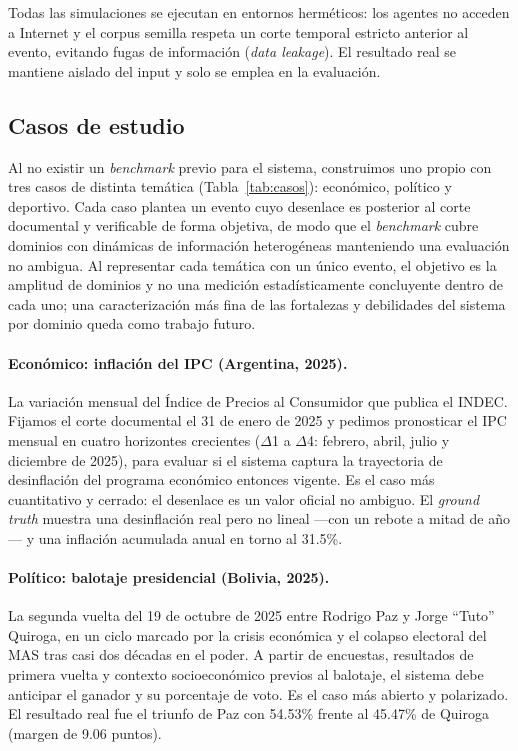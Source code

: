 \documentclass[11pt]{article}
\begin{document}
Todas las simulaciones se ejecutan en entornos herméticos: los agentes no acceden a Internet y el corpus semilla respeta un corte temporal estricto anterior al evento, evitando fugas de información (\textit{data leakage}). El resultado real se mantiene aislado del input y solo se emplea en la evaluación.

\subsection{Casos de estudio}
\label{subsec:casos}

Al no existir un \textit{benchmark} previo para el sistema, construimos uno propio con tres casos de distinta temática (Tabla~\ref{tab:casos}): económico, político y deportivo. Cada caso plantea un evento cuyo desenlace es posterior al corte documental y verificable de forma objetiva, de modo que el \textit{benchmark} cubre dominios con dinámicas de información heterogéneas manteniendo una evaluación no ambigua. Al representar cada temática con un único evento, el objetivo es la amplitud de dominios y no una medición estadísticamente concluyente dentro de cada uno; una caracterización más fina de las fortalezas y debilidades del sistema por dominio queda como trabajo futuro.

\paragraph{Económico: inflación del IPC (Argentina, 2025).} La variación mensual del Índice de Precios al Consumidor que publica el INDEC. Fijamos el corte documental el 31 de enero de 2025 y pedimos pronosticar el IPC mensual en cuatro horizontes crecientes ($\Delta$1 a $\Delta$4: febrero, abril, julio y diciembre de 2025), para evaluar si el sistema captura la trayectoria de desinflación del programa económico entonces vigente. Es el caso más cuantitativo y cerrado: el desenlace es un valor oficial no ambiguo. El \textit{ground truth} muestra una desinflación real pero no lineal —con un rebote a mitad de año— y una inflación acumulada anual en torno al 31.5\%.

\paragraph{Político: balotaje presidencial (Bolivia, 2025).} La segunda vuelta del 19 de octubre de 2025 entre Rodrigo Paz y Jorge ``Tuto'' Quiroga, en un ciclo marcado por la crisis económica y el colapso electoral del MAS tras casi dos décadas en el poder. A partir de encuestas, resultados de primera vuelta y contexto socioeconómico previos al balotaje, el sistema debe anticipar el ganador y su porcentaje de voto. Es el caso más abierto y polarizado. El resultado real fue el triunfo de Paz con 54.53\% frente al 45.47\% de Quiroga (margen de 9.06 puntos).
\end{document}

